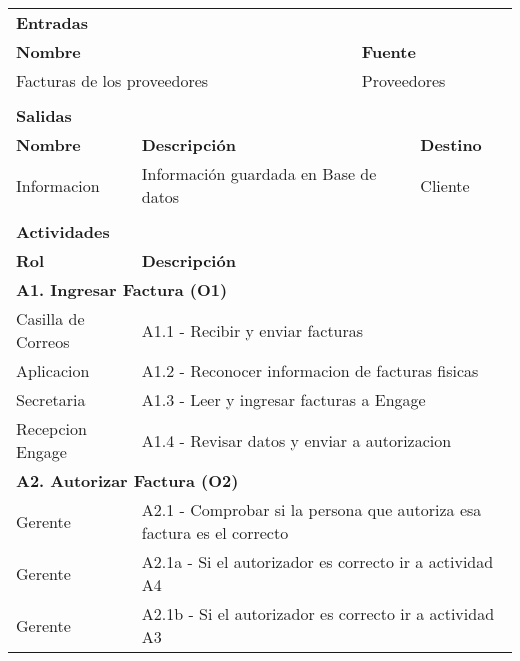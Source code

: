 \begin{longtable}{|llrrrrrr|}
          &       &       &       &       &       &       &  \\ \hline
    \multicolumn{8}{|l|}{\textbf{Entradas}} \\ \hline
    \multicolumn{5}{|l|}{\textbf{Nombre}}   & \multicolumn{3}{|l|}{\textbf{Fuente}} \\ \hline
    \multicolumn{5}{|l|}{Facturas de los proveedores} & \multicolumn{3}{|l|}{Proveedores} \\  \hline
       &       &       &       &       &       &       &  \\ \hline
    \multicolumn{8}{|l|}{\textbf{Salidas}} \\ \hline
    \textbf{Nombre} & \multicolumn{5}{|l|}{\textbf{Descripción}} & \multicolumn{2}{|l|}{\textbf{Destino}} \\ \hline
    Informacion & \multicolumn{5}{|l|}{Información guardada en Base de datos} & \multicolumn{2}{|l|}{Cliente} \\ \hline
       &       &       &       &       &       &       &  \\ \hline
	\multicolumn{8}{|l|}{\textbf{Actividades}} \\ \hline
    \textbf{Rol} & \multicolumn{7}{|l|}{\textbf{Descripción}} \\ \hline
   
    \multicolumn{8}{|l|}{\textbf{A1. Ingresar Factura (O1)}} \\ \hline
   	Casilla de Correos & \multicolumn{7}{|l|}{A1.1 - Recibir y enviar facturas} \\ \hline 
   	Aplicacion & \multicolumn{7}{|l|}{A1.2 - Reconocer informacion de facturas fisicas} \\ \hline
  	Secretaria & \multicolumn{7}{|l|}{A1.3 - Leer y ingresar facturas a Engage} \\ \hline
  	Recepcion Engage & \multicolumn{7}{|l|}{A1.4 - Revisar datos y enviar a autorizacion} \\ \hline
    
    \multicolumn{8}{|l|}{\textbf{A2. Autorizar Factura (O2)}} \\ \hline
    Gerente & \multicolumn{7}{|m{12cm}|}{A2.1 - Comprobar si la persona que autoriza esa factura es el correcto} \\ \hline
    Gerente & \multicolumn{7}{|m{12cm}|}{A2.1a - Si el autorizador es correcto ir a actividad A4 } \\ \hline
    Gerente & \multicolumn{7}{|l|}{A2.1b - Si el autorizador es correcto ir a actividad A3 } \\ \hline


\end{longtable}
